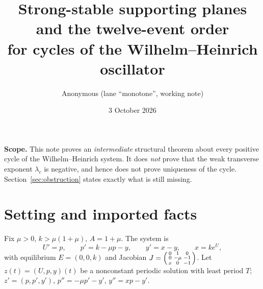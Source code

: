 \documentclass[11pt,a4paper]{article}
\title{Strong-stable supporting planes and the twelve-event order\\
for cycles of the Wilhelm--Heinrich oscillator}
\author{Anonymous (lane ``monotone'', working note)}
\date{3 October 2026}
\theoremstyle{remark}\newtheorem{remark}[theorem]{Remark}
\begin{document}
\maketitle

\noindent\textbf{Scope.} This note proves an \emph{intermediate} structural theorem about every
positive cycle of the Wilhelm--Heinrich system. It does \emph{not} prove that the weak
transverse exponent $\lambda_c$ is negative, and hence does not prove uniqueness of the cycle.
Section~\ref{sec:obstruction} states exactly what is still missing.

\section{Setting and imported facts}
Fix $\mu>0$, $k>\mu(1+\mu)$, $A=1+\mu$. The system is
\begin{equation}\label{sys}
U'=p,\qquad p'=k-\mu p-y,\qquad y'=x-y,\qquad x=ke^{U},
\end{equation}
with equilibrium $E=(0,0,k)$ and Jacobian
$J=\begin{psmallmatrix}0&1&0\\0&-\mu&-1\\x&0&-1\end{psmallmatrix}$.
Let $z(t)=(U,p,y)(t)$ be a nonconstant periodic solution with least period $T$; $z'=(p,p',y')$,
$p''=-\mu p'-y'$, $y''=xp-y'$.
\end{document}
